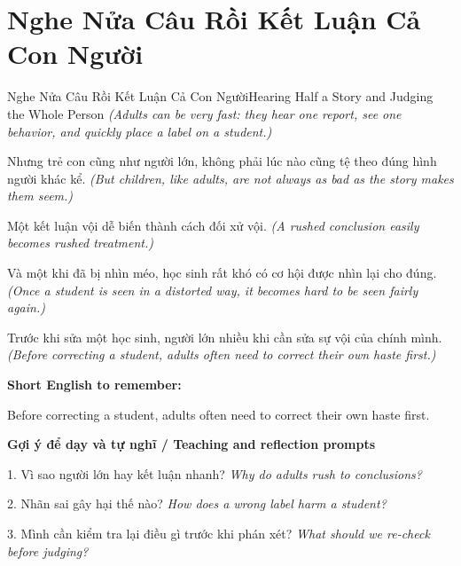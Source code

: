 \section{Nghe Nửa Câu Rồi Kết Luận Cả Con Người}
\begin{truyen}{Nghe Nửa Câu Rồi Kết Luận Cả Con Người}{Hearing Half a Story and Judging the Whole Person}
\textit{(Adults can be very fast: they hear one report, see one behavior, and quickly place a label on a student.)}

Nhưng trẻ con cũng như người lớn, không phải lúc nào cũng tệ theo đúng hình người khác kể.
\textit{(But children, like adults, are not always as bad as the story makes them seem.)}

Một kết luận vội dễ biến thành cách đối xử vội.
\textit{(A rushed conclusion easily becomes rushed treatment.)}

Và một khi đã bị nhìn méo, học sinh rất khó có cơ hội được nhìn lại cho đúng.
\textit{(Once a student is seen in a distorted way, it becomes hard to be seen fairly again.)}

\end{truyen}

\begin{baihoc}
Trước khi sửa một học sinh, người lớn nhiều khi cần sửa sự vội của chính mình.
\textit{(Before correcting a student, adults often need to correct their own haste first.)}
\end{baihoc}

\begin{ghinhoanh}
\textbf{Short English to remember:}

Before correcting a student, adults often need to correct their own haste first.

\end{ghinhoanh}

\begin{tuhocnhanh}
\textbf{Gợi ý để dạy và tự nghĩ / Teaching and reflection prompts}

1. Vì sao người lớn hay kết luận nhanh? \textit{Why do adults rush to conclusions?}

2. Nhãn sai gây hại thế nào? \textit{How does a wrong label harm a student?}

3. Mình cần kiểm tra lại điều gì trước khi phán xét? \textit{What should we re-check before judging?}
\end{tuhocnhanh}
\ngancach

